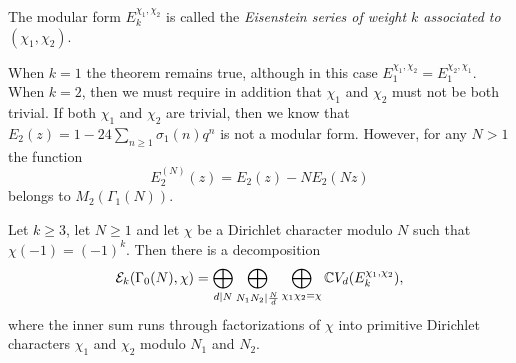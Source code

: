The modular form $E_k^{\chi_1,\chi_2}$ is called the \emph{Eisenstein series of weight $k$ associated to $(\chi_1,\chi_2)$}.

\begin{remark}
When $k=1$ the theorem remains true, although in this case $E_1^{\chi_1,\chi_2} = E_1^{\chi_2,\chi_1}$. When $k=2$, then we must require in addition that $\chi_1$ and $\chi_2$ must not be both trivial. If both $\chi_1$ and $\chi_2$ are trivial, then we know that $E_2(z)=1-24\sum_{n\geq 1} \sigma_1(n)q^n$ is not a modular form. However, for any $N>1$ the function
\[
E_2^{(N)}(z)=E_2(z)-NE_2(Nz)
\]
belongs to $M_2(\Gamma_1(N))$.
\end{remark}

\begin{theorem}
  Let $k\geq 3$, let $N\geq 1$ and let $\chi$ be a Dirichlet character modulo $N$ such that $\chi(-1) = (-1)^k$. Then there is a decomposition
\[
\mathcal{E}_k(\Gamma_0(N),\chi) = \bigoplus_{d\mid N}\bigoplus_{N_1N_2 \mid\frac Nd} \bigoplus_{\chi_1\chi_2=\chi}\mathbb{C} V_d(E_k^{\chi_1,\chi_2}),
\]
where the inner sum runs through factorizations of $\chi$ into primitive Dirichlet characters $\chi_1$ and $\chi_2$ modulo $N_1$ and $N_2$.
\end{theorem}

